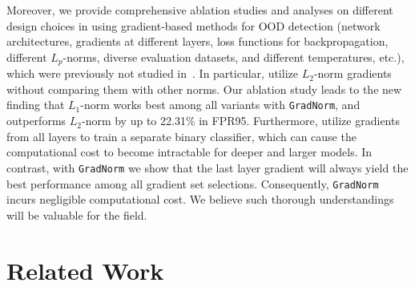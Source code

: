\documentclass{article}
\begin{document}
Moreover, we provide comprehensive ablation studies and analyses on different design choices in using gradient-based methods for OOD detection (network architectures, gradients at different layers, loss functions for backpropagation, different $L_p$-norms, diverse evaluation datasets, and different temperatures, etc.), which were previously not studied in~\cite{lee2020gradients}. In particular, \citeauthor{lee2020gradients} utilize $L_2$-norm gradients without comparing them with other norms. Our ablation study leads to the new finding that $L_1$-norm works best among all variants with \texttt{GradNorm}, and outperforms $L_2$-norm by up to 22.31\% in FPR95. Furthermore, \citeauthor{lee2020gradients} utilize gradients from all layers to train a separate binary classifier, which can cause the computational cost to become intractable for deeper and larger models. In contrast, with \texttt{GradNorm} we show that the last layer gradient will always yield the best performance among all gradient set selections. Consequently, \texttt{GradNorm} incurs negligible computational cost. We believe such thorough understandings will be valuable for the field.


\vspace{-0.1cm}
\section{Related Work}
\label{sec:related_work}
\vspace{-0.3cm}
\end{document}
